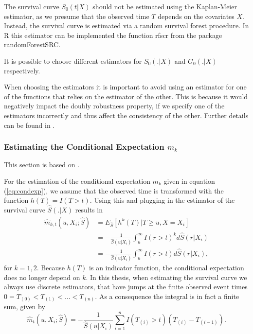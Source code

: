 \documentclass[12pt, a4paper]{article}
\theoremstyle{definition}
\theoremstyle{plain}
\numberwithin{equation}{section}
\numberwithin{figure}{section}
\numberwithin{table}{section}
\begin{document}
	The survival curve $S_0(t\vert X)$ should not be estimated using the Kaplan-Meier estimator, as we presume that the observed time $T$ depends on the covariates $X$.
	Instead, the survival curve is estimated via a random survival forest procedure.
	In R this estimator can be implemented the function rfscr from the package randomForestSRC. 
	
	It is possible to choose different estimators for $S_0(.\vert X)$ and $G_0(.\vert X)$ respectively.
	
	When choosing the estimators it is important to avoid using an estimator for one of the functions that relies on the estimator of the other.
	This is because it would negatively impact the doubly robustness property, if we specify one of the estimators incorrectly and thus affect the consistency of the other.
	Further details can be found in \citet*{drtrees}.
	
	\subsubsection{Estimating the Conditional Expectation $m_k$}
	
	This section is based on \citet*{drtrees}.
	
	For the estimation of the conditional expectation $m_k$ given in equation (\ref{eq:condexp}), we assume that the observed time is transformed with the function $h(T) = I(T>t)$.
	Using this and plugging in the estimator of the survival curve $\hat{S}(.\vert X)$ results in
	\begin{equation*}
	\begin{split}
	\hat{m}_{k,t} (u, X_i; \hat{S}) &= E_{\hat{S}}[h^k(T)\vert T \geq u, X=X_i]\\
	&=-\frac{1}{\hat{S}(u\vert X_i)}\int_u^{\infty}I(r> t)^kd\hat{S}(r\vert X_i)\\
	&=-\frac{1}{\hat{S}(u\vert X_i)}\int_u^{\infty}I(r> t)d\hat{S}(r\vert X_i),
	\end{split}
	\end{equation*}
	for $k=1,2$.
	Because $h(T)$ is an indicator function, the conditional expectation does no longer depend on $k$.
	In this thesis, when estimating the survival curve we always use discrete estimators, that have jumps at the finite observed event times $0=T_{(0)}<T_{(1)}<\dots<T_{(n)}$.
	As a consequence the integral is in fact a finite sum, given by
	\begin{equation*}
	\hat{m}_t (u, X_i; \hat{S}) = -\frac{1}{\hat{S}(u\vert X_i)}\sum_{i=1}^n I(T_{(i)}>t)(T_{(i)}-T_{(i-1)}).
	\end{equation*}
	
\end{document}
